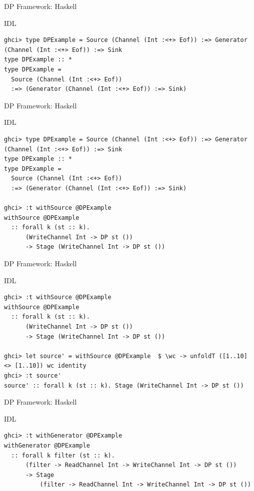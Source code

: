 \documentclass{beamer}
\begin{document}
  \begin{frame}[fragile]{DP Framework: Haskell}
    \begin{block}{IDL}
      \begin{verbatim}      
ghci> type DPExample = Source (Channel (Int :<+> Eof)) :=> Generator (Channel (Int :<+> Eof)) :=> Sink
type DPExample :: *
type DPExample =
  Source (Channel (Int :<+> Eof))
  :=> (Generator (Channel (Int :<+> Eof)) :=> Sink)
    \end{verbatim}
  \end{block}
  \end{frame}

  \begin{frame}[fragile]{DP Framework: Haskell}
    \begin{block}{IDL}
      \begin{verbatim}      
ghci> type DPExample = Source (Channel (Int :<+> Eof)) :=> Generator (Channel (Int :<+> Eof)) :=> Sink
type DPExample :: *
type DPExample =
  Source (Channel (Int :<+> Eof))
  :=> (Generator (Channel (Int :<+> Eof)) :=> Sink)
        
ghci> :t withSource @DPExample
withSource @DPExample
  :: forall k (st :: k).
      (WriteChannel Int -> DP st ())
      -> Stage (WriteChannel Int -> DP st ())
    \end{verbatim}
  \end{block}
  \end{frame}

  \begin{frame}[fragile]{DP Framework: Haskell}
    \begin{block}{IDL}
      \begin{verbatim}      
ghci> :t withSource @DPExample
withSource @DPExample
  :: forall k (st :: k).
      (WriteChannel Int -> DP st ())
      -> Stage (WriteChannel Int -> DP st ())
      
ghci> let source' = withSource @DPExample  $ \wc -> unfoldT ([1..10] <> [1..10]) wc identity
ghci> :t source'
source' :: forall k (st :: k). Stage (WriteChannel Int -> DP st ())
    \end{verbatim}
  \end{block}
  \end{frame}

  \begin{frame}[fragile]{DP Framework: Haskell}
    \begin{block}{IDL}
      \begin{verbatim}      
ghci> :t withGenerator @DPExample
withGenerator @DPExample
  :: forall k filter (st :: k).
      (filter -> ReadChannel Int -> WriteChannel Int -> DP st ())
      -> Stage
          (filter -> ReadChannel Int -> WriteChannel Int -> DP st ())    
    \end{verbatim}
  \end{block}
  \end{frame}
\end{document}
